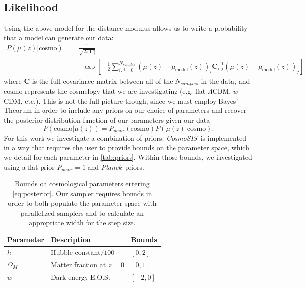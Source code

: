 \documentclass[12pt,a4paper]{article}
\newcommand\Planck{{\it Planck}\ }
\newcommand\CosmoSIS{{\it CosmoSIS}\ }
\begin{document}
\subsection{Likelihood}
\label{sec:likelihood}
Using the above model for the distance modulus allows us to write a
probability that a model can generate our data:
%
\begin{align}
  \label{eq:likelihood}
  P(\mu(z)|\mathrm{cosmo}) &= \frac{1}{\sqrt{2\pi|\mathbf{C}|}}\nonumber \\
  &\qquad{}\exp\left[-\frac{1}{2} \sum_{i,j=0}^{N_{samples}}\left(\mu(z) - \mu_{\mathrm{model}}(z)\right)_i 
    \mathbf{C}^{-1}_{i,j}\left(\mu(z) - \mu_{\mathrm{model}}(z)\right)_j\right]
\end{align}
%
where $\mathbf{C}$ is the full covariance matrix between all of the $N_{samples}$ 
in the data, and $\mathrm{cosmo}$ represents the cosmology that we are investigating
(e.g. flat $\Lambda$CDM, $w$CDM, etc.). 
This is not the full picture though, since we must employ
Bayes' Theorum in order to include any priors on our choice of 
parameters and recover the posterior distribution function of our
parameters given our data
%
\begin{equation}
  \label{eq:posterior}
  P(\mathrm{cosmo}|\mu(z)) = P_{prior}(\mathrm{cosmo}) P(\mu(z)|\mathrm{cosmo}).
\end{equation}
%
For this work we investigate a combination of priors. \CosmoSIS is implemented
in a way that requires the user to provide bounds on the parameter space, which we
detail for each parameter in \autoref{tab:priors}.
Within those bounds, we investigated using a flat prior $P_{prior}=1$ and
\Planck priors.

\begin{table}
  \centering
  \caption{Bounds on cosmological parameters 
    entering \autoref{eq:posterior}. Our sampler requires
    bounds in order to both populate the parameter space with
    parallelized samplers and to calculate an appropriate width
    for the step size.}
  \label{tab:priors}
  \begin{tabular}{lll}
    Parameter & Description & Bounds \\ \hline
    $h$ & Hubble constant$/100$ & $[0,2]$ \\
    $\Omega_M$ & Matter fraction at $z=0$ & $[0,1]$ \\
    $w$ & Dark energy E.O.S. & $[-2,0]$\\
  \end{tabular}
\end{table}
\end{document}
